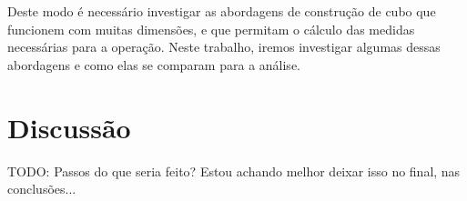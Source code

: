Deste modo é necessário investigar as abordagens de construção de cubo que funcionem com muitas dimensões, e que permitam o cálculo das medidas necessárias para a operação.
Neste trabalho, iremos investigar algumas dessas abordagens e como elas se comparam para a análise.

\section{Discussão}
\label{ch:prop:discussao}

{\color{red}
	TODO: Passos do que seria feito? Estou achando melhor deixar isso no final, nas conclusões...
}

